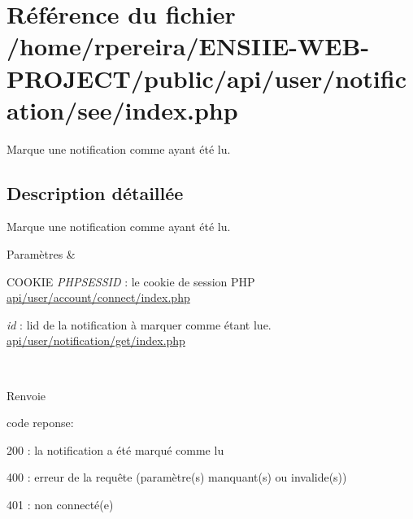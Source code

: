 \hypertarget{notification_2see_2index_8php}{}\section{Référence du fichier /home/rpereira/\+E\+N\+S\+I\+I\+E-\/\+W\+E\+B-\/\+P\+R\+O\+J\+E\+C\+T/public/api/user/notification/see/index.php}
\label{notification_2see_2index_8php}


Marque une notification comme ayant été lu.  




\subsection{Description détaillée}
Marque une notification comme ayant été lu. 


\begin{DoxyParams}{Paramètres}
{\em } & 
\begin{DoxyItemize}
\item C\+O\+O\+K\+IE {\itshape P\+H\+P\+S\+E\+S\+S\+ID} \+: le cookie de session P\+HP \hyperlink{account_2connect_2index_8php}{api/user/account/connect/index.\+php}
\item {\itshape id} \+: l\textquotesingle{}id de la notification à marquer comme étant lue. \hyperlink{notification_2get_2index_8php}{api/user/notification/get/index.\+php} 
\end{DoxyItemize}\\
\hline
\end{DoxyParams}
\begin{DoxyReturn}{Renvoie}

\begin{DoxyItemize}
\item code reponse\+:
\begin{DoxyItemize}
\item 200 \+: la notification a été marqué comme lu
\item 400 \+: erreur de la requête (paramètre(s) manquant(s) ou invalide(s))
\item 401 \+: non connecté(e) 
\end{DoxyItemize}
\end{DoxyItemize}
\end{DoxyReturn}
